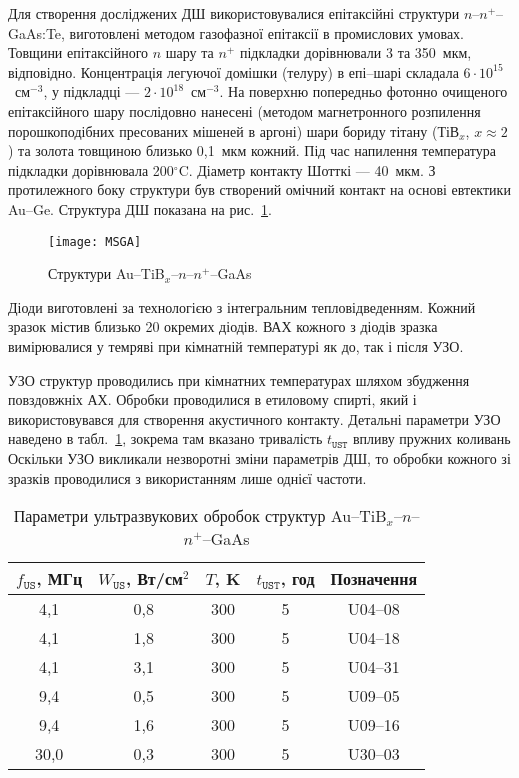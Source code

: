 Для створення досліджених ДШ використовувалися епітаксійні структури $n$--$n^+$--GaAs:Te,
виготовлені методом газофазної епітаксії в промислових умовах.
Товщини епітаксійного $n$ шару та $n^+$ підкладки дорівнювали 3 та 350~мкм, відповідно.
Концентрація легуючої домішки (телуру) в епі--шарі складала $6\cdot10^{15}$~см$^{-3}$,
у підкладці --- $2\cdot10^{18}$~см$^{-3}$.
На поверхню попередньо фотонно очищеного епітаксійного шару послідовно нанесені
(методом магнетронного розпилення порошкоподібних пресованих мішеней в аргоні)
шари бориду тітану (ТіВ$_x$, $x\approx2$) та золота товщиною близько 0,1~мкм кожний.
Під час напилення температура підкладки дорівнювала 200$^\circ$C.
Діаметр контакту Шотткі --- 40~мкм.
З протилежного боку структури був створений омічний контакт на основі евтектики Au--Ge.
Структура ДШ показана на рис.~\ref{figMSGA}.

\begin{figure}[b]
\center
\texttt{[image: MSGA]}%
\caption{\label{figMSGA}
Структури Au--TiB$_x$--$n$--$n^+$--GaAs
}
\end{figure}

Діоди виготовлені за технологією з інтегральним тепловідведенням.
Кожний зразок містив близько 20 окремих діодів.
ВАХ кожного з діодів зразка вимірювалися у темряві при кімнатній температурі
як до, так і після УЗО.

УЗО структур проводились при кімнатних температурах шляхом збудження повздовжніх АХ.
Обробки проводилися в етиловому спирті, який і використовувався для створення акустичного контакту.
Детальні параметри УЗО наведено в табл.~\ref{tabUST}, зокрема там вказано тривалість $t_\mathtt{UST}$ впливу пружних коливань
Оскільки УЗО викликали незворотні зміни параметрів ДШ, то обробки кожного зі зразків проводилися з використанням лише однієї частоти.

\begin{table}
\caption{\label{tabUST}Параметри ультразвукових обробок структур Au--TiB$_x$--$n$--$n^+$--GaAs
}
\center
\begin{tabular}{|c|c|c|c|c|}
\hline
$f_\mathtt{US}$, МГц&$W_{\mathtt{US}}$, Вт/см$^2$&$T$, K&$t_\mathtt{UST}$, год &Позначення\\
\hline
4,1&0,8&300&5&U04--08\\ \hline
4,1&1,8&300&5&U04--18\\ \hline
4,1&3,1&300&5&U04--31\\ \hline
9,4&0,5&300&5&U09--05\\ \hline
9,4&1,6&300&5&U09--16\\ \hline
30,0&0,3&300&5&U30--03\\ \hline
\end{tabular}
\end{table}


